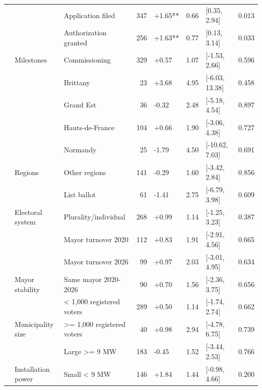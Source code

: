 \begin{ThreePartTable}
\begin{longtable}[t]{lllrllll}
\cmidrule{2-8}\nopagebreak
 &  & Application filed & 347 & +1.65** & 0.66 & {}[0.35, 2.94] & 0.013\\
\cmidrule{3-8}\nopagebreak
 &  & Authorization granted & 256 & +1.63** & 0.77 & {}[0.13, 3.14] & 0.033\\
\cmidrule{3-8}\nopagebreak
 & \multirow[t]{-3}{*}{\raggedright\arraybackslash Milestones} & Commissioning & 329 & +0.57 & 1.07 & {}[-1.53, 2.66] & 0.596\\
\cmidrule{2-8}\nopagebreak
 &  & Brittany & 23 & +3.68 & 4.95 & {}[-6.03, 13.38] & 0.458\\
\cmidrule{3-8}\nopagebreak
 &  & Grand Est & 36 & -0.32 & 2.48 & {}[-5.18, 4.54] & 0.897\\
\cmidrule{3-8}\nopagebreak
 &  & Hauts-de-France & 104 & +0.66 & 1.90 & {}[-3.06, 4.38] & 0.727\\
\cmidrule{3-8}\nopagebreak
 &  & Normandy & 25 & -1.79 & 4.50 & {}[-10.62, 7.03] & 0.691\\
\cmidrule{3-8}\nopagebreak
 & \multirow[t]{-5}{*}{\raggedright\arraybackslash Regions} & Other regions & 141 & -0.29 & 1.60 & {}[-3.42, 2.84] & 0.856\\
\cmidrule{2-8}\nopagebreak
 &  & List ballot & 61 & -1.41 & 2.75 & {}[-6.79, 3.98] & 0.609\\
\cmidrule{3-8}\nopagebreak
 & \multirow[t]{-2}{*}{\raggedright\arraybackslash Electoral system} & Plurality/individual & 268 & +0.99 & 1.14 & {}[-1.25, 3.23] & 0.387\\
\cmidrule{2-8}\nopagebreak
 &  & Mayor turnover 2020 & 112 & +0.83 & 1.91 & {}[-2.91, 4.56] & 0.665\\
\cmidrule{3-8}\nopagebreak
 &  & Mayor turnover 2026 & 99 & +0.97 & 2.03 & {}[-3.01, 4.95] & 0.634\\
\cmidrule{3-8}\nopagebreak
 & \multirow[t]{-3}{*}{\raggedright\arraybackslash Mayor stability} & Same mayor 2020-2026 & 90 & +0.70 & 1.56 & {}[-2.36, 3.75] & 0.656\\
\cmidrule{2-8}\nopagebreak
 &  & < 1,000 registered voters & 289 & +0.50 & 1.14 & {}[-1.74, 2.74] & 0.662\\
\cmidrule{3-8}\nopagebreak
 & \multirow[t]{-2}{*}{\raggedright\arraybackslash Municipality size} & >= 1,000 registered voters & 40 & +0.98 & 2.94 & {}[-4.78, 6.75] & 0.739\\
\cmidrule{2-8}\nopagebreak
 &  & Large >= 9 MW & 183 & -0.45 & 1.52 & {}[-3.44, 2.53] & 0.766\\
\cmidrule{3-8}\nopagebreak
 & \multirow[t]{-2}{*}{\raggedright\arraybackslash Installation power} & Small < 9 MW & 146 & +1.84 & 1.44 & {}[-0.98, 4.66] & 0.200\\

\end{longtable}
\end{ThreePartTable}
